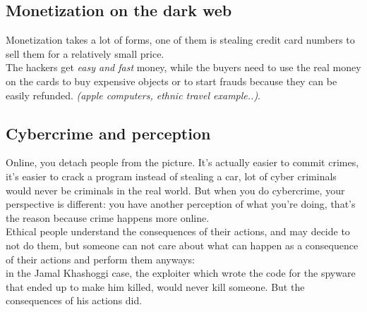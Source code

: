     \subsection{Monetization on the dark web}
        Monetization takes a lot of forms, one of them is stealing credit card numbers to sell them for a relatively small price.\\
        The hackers get \textit{easy and fast} money, while the buyers need to use the real money on the cards to buy expensive objects or to start frauds because they can be easily refunded. \textit{(apple computers, ethnic travel example..)}.
    \subsection{Cybercrime and perception}
        Online, you detach people from the picture. It's actually easier to commit crimes, it's easier to crack a program instead of stealing a car, lot of cyber criminals would never be criminals in the real world.
        But when you do cybercrime, your perspective is different: you have another perception of what you're doing, that's the reason because crime happens more online.\\
        Ethical people understand the consequences of their actions, and may decide to not do them, but someone can not care about what can happen as a consequence of their actions and perform them anyways:\\
        in the Jamal Khashoggi case, the exploiter which wrote the code for the spyware that ended up to make him killed, would never kill someone. But the consequences of his actions did.
